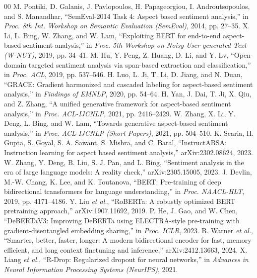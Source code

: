 \documentclass[conference]{IEEEtran}
\begin{document}
\begin{thebibliography}{00}
 M. Pontiki, D. Galanis, J. Pavlopoulos, H. Papageorgiou, I. Androutsopoulos, and S. Manandhar, ``SemEval-2014 Task 4: Aspect based sentiment analysis,'' in \emph{Proc. 8th Int. Workshop on Semantic Evaluation (SemEval)}, 2014, pp. 27--35.
 X. Li, L. Bing, W. Zhang, and W. Lam, ``Exploiting BERT for end-to-end aspect-based sentiment analysis,'' in \emph{Proc. 5th Workshop on Noisy User-generated Text (W-NUT)}, 2019, pp. 34--41.
 M. Hu, Y. Peng, Z. Huang, D. Li, and Y. Lv, ``Open-domain targeted sentiment analysis via span-based extraction and classification,'' in \emph{Proc. ACL}, 2019, pp. 537--546.
 H. Luo, L. Ji, T. Li, D. Jiang, and N. Duan, ``GRACE: Gradient harmonized and cascaded labeling for aspect-based sentiment analysis,'' in \emph{Findings of EMNLP}, 2020, pp. 54--64.
 H. Yan, J. Dai, T. Ji, X. Qiu, and Z. Zhang, ``A unified generative framework for aspect-based sentiment analysis,'' in \emph{Proc. ACL-IJCNLP}, 2021, pp. 2416--2429.
 W. Zhang, X. Li, Y. Deng, L. Bing, and W. Lam, ``Towards generative aspect-based sentiment analysis,'' in \emph{Proc. ACL-IJCNLP (Short Papers)}, 2021, pp. 504--510.
 K. Scaria, H. Gupta, S. Goyal, S. A. Sawant, S. Mishra, and C. Baral, ``InstructABSA: Instruction learning for aspect based sentiment analysis,'' arXiv:2302.08624, 2023.
 W. Zhang, Y. Deng, B. Liu, S. J. Pan, and L. Bing, ``Sentiment analysis in the era of large language models: A reality check,'' arXiv:2305.15005, 2023.
 J. Devlin, M.-W. Chang, K. Lee, and K. Toutanova, ``BERT: Pre-training of deep bidirectional transformers for language understanding,'' in \emph{Proc. NAACL-HLT}, 2019, pp. 4171--4186.
 Y. Liu \emph{et al.}, ``RoBERTa: A robustly optimized BERT pretraining approach,'' arXiv:1907.11692, 2019.
 P. He, J. Gao, and W. Chen, ``DeBERTaV3: Improving DeBERTa using ELECTRA-style pre-training with gradient-disentangled embedding sharing,'' in \emph{Proc. ICLR}, 2023.
 B. Warner \emph{et al.}, ``Smarter, better, faster, longer: A modern bidirectional encoder for fast, memory efficient, and long context finetuning and inference,'' arXiv:2412.13663, 2024.
 X. Liang \emph{et al.}, ``R-Drop: Regularized dropout for neural networks,'' in \emph{Advances in Neural Information Processing Systems (NeurIPS)}, 2021.

\end{thebibliography}
\end{document}
